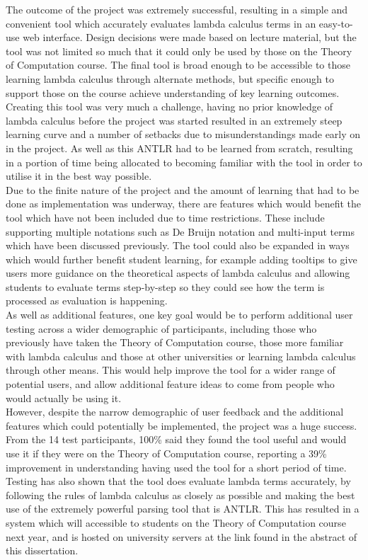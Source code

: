 \documentclass[a4paper,11pt]{report}
\begin{document}
The outcome of the project was extremely successful, resulting in a simple and convenient tool which accurately evaluates lambda calculus terms in an easy-to-use web interface. Design decisions were made based on lecture material, but the tool was not limited so much that it could only be used by those on the Theory of Computation course. The final tool is broad enough to be accessible to those learning lambda calculus through alternate methods, but specific enough to support those on the course achieve understanding of key learning outcomes.\\

Creating this tool was very much a challenge, having no prior knowledge of lambda calculus before the project was started resulted in an extremely steep learning curve and a number of setbacks due to misunderstandings made early on in the project. As well as this ANTLR had to be learned from scratch, resulting in a portion of time being allocated to becoming familiar with the tool in order to utilise it in the best way possible.\\

Due to the finite nature of the project and the amount of learning that had to be done as implementation was underway, there are features which would benefit the tool which have not been included due to time restrictions. These include supporting multiple notations such as De Bruijn notation and multi-input terms which have been discussed previously. The tool could also be expanded in ways which would further benefit student learning, for example adding tooltips to give users more guidance on the theoretical aspects of lambda calculus and allowing students to evaluate terms step-by-step so they could see how the term is processed as evaluation is happening.\\

As well as additional features, one key goal would be to perform additional user testing across a wider demographic of participants, including those who previously have taken the Theory of Computation course, those more familiar with lambda calculus and those at other universities or learning lambda calculus through other means. This would help improve the tool for a wider range of potential users, and allow additional feature ideas to come from people who would actually be using it.\\

However, despite the narrow demographic of user feedback and the additional features which could potentially be implemented, the project was a huge success. From the 14 test participants, 100\% said they found the tool useful and would use it if they were on the Theory of Computation course, reporting a 39\% improvement in understanding having used the tool for a short period of time. Testing has also shown that the tool does evaluate lambda terms accurately, by following the rules of lambda calculus as closely as possible and making the best use of the extremely powerful parsing tool that is ANTLR. This has resulted in a system which will accessible to students on the Theory of Computation course next year, and is hosted on university servers at the link found in the abstract of this dissertation.\\
\end{document}

